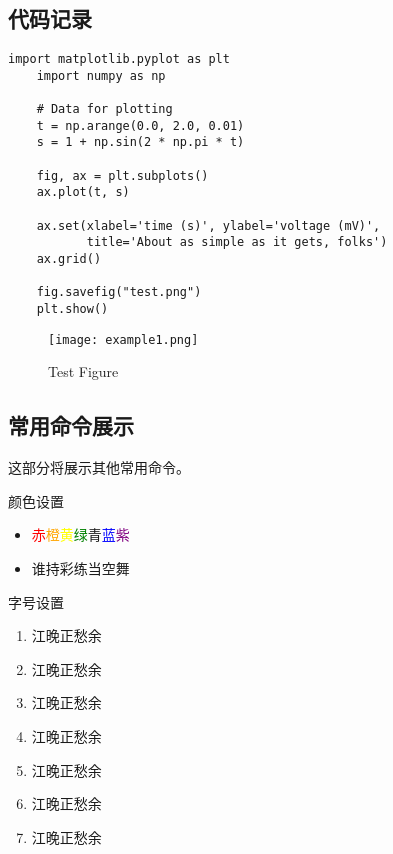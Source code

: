 \documentclass[dvipsnames, svgnames,a4paper,11pt]{article}
\begin{document}
\subsection{代码记录}
\begin{lstlisting}[style=pythonstyle,caption=代码记录示例]
	import matplotlib.pyplot as plt
	import numpy as np
	
	# Data for plotting
	t = np.arange(0.0, 2.0, 0.01)
	s = 1 + np.sin(2 * np.pi * t)
	
	fig, ax = plt.subplots()
	ax.plot(t, s)
	
	ax.set(xlabel='time (s)', ylabel='voltage (mV)',
		   title='About as simple as it gets, folks')
	ax.grid()
	
	fig.savefig("test.png")
	plt.show()
\end{lstlisting}
\begin{figure}[H]
    \centering
    \texttt{[image: example1.png]}
    \caption{Test Figure}
\end{figure}

\clearpage
\subsection{常用命令展示}
这部分将展示其他常用命令。

\begin{tbox}{颜色设置}
\begin{itemize}
	\item  \textcolor{Red}{赤}\textcolor{Orange}{橙}\textcolor{Yellow}{黄}\textcolor{Green}{绿}\textcolor{Emerald}{青}\textcolor{Blue}{蓝}\textcolor{Purple}{紫}
	\item  谁持彩练当空舞
\end{itemize}
\end{tbox}

\begin{tbox}{字号设置}
\begin{enumerate}
	\item {\LARGE 江晚正愁余}
	\item {\Large 江晚正愁余}
	\item {\large 江晚正愁余}
	\item {\normalsize 江晚正愁余}
	\item {\small 江晚正愁余}
	\item {\footnotesize 江晚正愁余}
	\item {\scriptsize 江晚正愁余}
\end{enumerate}
\end{tbox}
\end{document}
